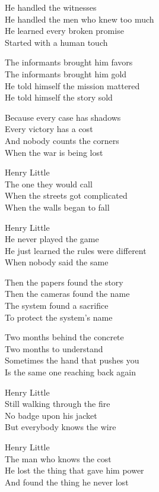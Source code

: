 \begin{lyrics}
He handled the witnesses\\
He handled the men who knew too much\\
He learned every broken promise\\
Started with a human touch

The informants brought him favors\\
The informants brought him gold\\
He told himself the mission mattered\\
He told himself the story sold

Because every case has shadows\\
Every victory has a cost\\
And nobody counts the corners\\
When the war is being lost

Henry Little\\
The one they would call\\
When the streets got complicated\\
When the walls began to fall

Henry Little\\
He never played the game\\
He just learned the rules were different\\
When nobody said the same

Then the papers found the story\\
Then the cameras found the name\\
The system found a sacrifice\\
To protect the system's name

Two months behind the concrete\\
Two months to understand\\
Sometimes the hand that pushes you\\
Is the same one reaching back again

Henry Little\\
Still walking through the fire\\
No badge upon his jacket\\
But everybody knows the wire

Henry Little\\
The man who knows the cost\\
He lost the thing that gave him power\\
And found the thing he never lost
\end{lyrics}

